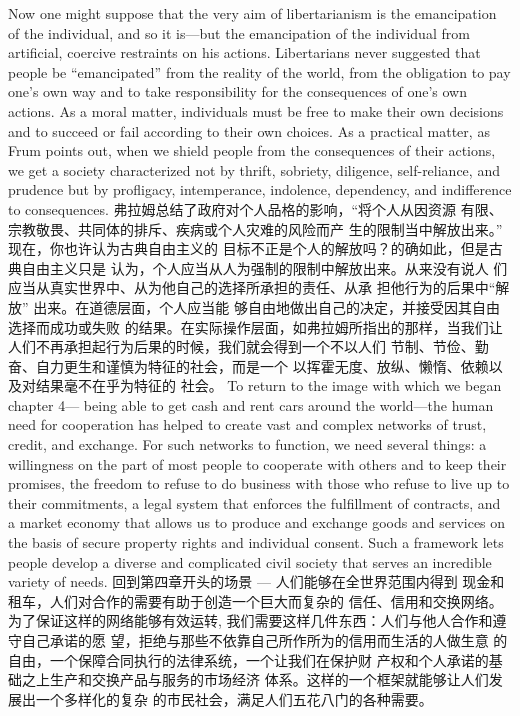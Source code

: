 \begin{paracol}{2}
Now one might suppose that the very aim of libertarianism is
the emancipation of the individual, and so it is---but the emancipation of the individual from artificial, coercive restraints on
his actions. Libertarians never suggested that people be ``emancipated'' from the reality of the world, from the obligation to
pay one's own way and to take responsibility for the consequences of one's own actions. As a moral matter, individuals
must be free to make their own decisions and to succeed or fail
according to their own choices. As a practical matter, as Frum
points out, when we shield people from the consequences of
their actions, we get a society characterized not by thrift, sobriety, diligence, self-reliance, and prudence but by profligacy, intemperance, indolence, dependency, and indifference to consequences.
\switchcolumn
弗拉姆总结了政府对个人品格的影响，“将个人从因资源
有限、宗教敬畏、共同体的排斥、疾病或个人灾难的风险而产
生的限制当中解放出来。” 现在，你也许认为古典自由主义的
目标不正是个人的解放吗？的确如此，但是古典自由主义只是
认为，个人应当从人为强制的限制中解放出来。从来没有说人
们应当从真实世界中、从为他自己的选择所承担的责任、从承
担他行为的后果中“解放” 出来。在道德层面，个人应当能
够自由地做出自己的决定，并接受因其自由选择而成功或失败
的结果。在实际操作层面，如弗拉姆所指出的那样，当我们让
人们不再承担起行为后果的时候，我们就会得到一个不以人们
节制、节俭、勤奋、自力更生和谨慎为特征的社会，而是一个
以挥霍无度、放纵、懒惰、依赖以及对结果毫不在乎为特征的
社会。
\switchcolumn*
To return to the image with which we began chapter 4---
being able to get cash and rent cars around the world---the
human need for cooperation has helped to create vast and complex networks of trust, credit, and exchange. For such networks
to function, we need several things: a willingness on the part of
most people to cooperate with others and to keep their
promises, the freedom to refuse to do business with those who
refuse to live up to their commitments, a legal system that enforces the fulfillment of contracts, and a market economy that
allows us to produce and exchange goods and services on the
basis of secure property rights and individual consent. Such a
framework lets people develop a diverse and complicated civil
society that serves an incredible variety of needs.
\switchcolumn
回到第四章开头的场景 --- 人们能够在全世界范围内得到
现金和租车，人们对合作的需要有助于创造一个巨大而复杂的
信任、信用和交换网络。为了保证这样的网络能够有效运转,
我们需要这样几件东西：人们与他人合作和遵守自己承诺的愿
望，拒绝与那些不依靠自己所作所为的信用而生活的人做生意
的自由，一个保障合同执行的法律系统，一个让我们在保护财
产权和个人承诺的基础之上生产和交换产品与服务的市场经济
体系。这样的一个框架就能够让人们发展出一个多样化的复杂
的市民社会，满足人们五花八门的各种需要。

\end{paracol}